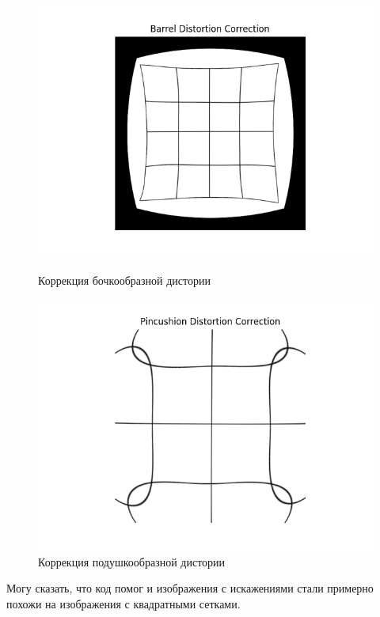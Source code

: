 \documentclass[a4paper,12pt]{article}
\begin{document}
\begin{figure}[H]
    \centering
    \begin{minipage}{0.48\textwidth}
        \centering
        \includegraphics[width=\linewidth]{lab2/task2/Figure_1.png}
        \caption{Коррекция бочкообразной дистории}
        \label{fig:reflect_ox}
    \end{minipage}
    \hfill
    \begin{minipage}{0.48\textwidth}
        \centering
        \includegraphics[width=\linewidth]{lab2/task2/Figure_2.png}
        \caption{Коррекция подушкообразной дистории}
        \label{fig:reflect_oy}
    \end{minipage}
\end{figure}
Могу сказать, что код помог и изображения с искажениями стали примерно похожи на изображения с квадратными сетками.
\end{document}
